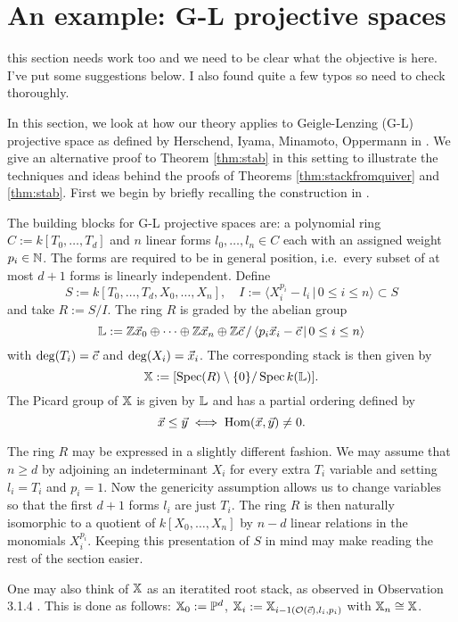 \documentclass[12pt]{amsart}
\begin{document}
\section{An example: G-L projective spaces} \label{sec:HIMO}

{\red this section needs work too and we need to be clear what the objective is here. I've put some suggestions below. I also found quite a few typos so need to check thoroughly.}

In this section, we look at how our theory applies to Geigle-Lenzing (G-L) projective space as defined by Herschend, Iyama, Minamoto, Oppermann in \cite{HIMO}.
We give an alternative proof to Theorem \ref{thm:stab} in this setting to illustrate the techniques and ideas behind the proofs of Theorems \ref{thm:stackfromquiver} and \ref{thm:stab}.
First we begin by briefly recalling the construction in \cite{HIMO}. 

The building blocks for G-L projective spaces are: a polynomial ring $C:= k[T_0, \ldots, T_d]$ and $n$ linear forms $l_0,\ldots,l_n \in C$ each with an assigned weight $p_i \in \mathbb{N}$. 
The forms are required to be in general position, i.e.\ every subset of at most $d+1$ forms is linearly independent. 
Define $$S:= k[T_0,\ldots, T_d, X_0, \ldots, X_n],  \quad I := \langle X_i^{p_i} - l_i \, | \, 0\leq i \leq n \rangle \subset S$$ and take $R:= S/I$. 
The ring $R$ is graded by the abelian group $$\mathbb{L}:= \mathbb{Z} {\vec{x}}_0 \oplus \cdots \oplus \mathbb{Z} {\vec{x}}_n \oplus \mathbb{Z} {\vec{c}} \,/\, \langle p_i {\vec{x}}_i - {\vec{c}} \, | \, 0\leq i \leq n \rangle$$ with $\deg(T_i)={\vec{c}}$ and $\deg(X_i) = {\vec{x}}_i$. 
The corresponding stack is then given by $$\mathbb{X}:= [\operatorname{Spec}(R) \setminus \{0\}/ \operatorname{Spec} k(\mathbb{L})].$$ 
The Picard group of $\mathbb{X}$ is given by $\mathbb{L}$ and has a partial ordering defined by $${\vec{x}} \leq {\vec{y}} \iff \operatorname{Hom}({\vec{x}}, {\vec{y}}) \neq 0.$$

The ring $R$ may be expressed in a slightly different fashion. 
We may assume that $n\geq d$ by adjoining an indeterminant $X_i$ for every extra $T_i$ variable and setting $l_i= T_i$ and $p_i=1$. 
Now the genericity assumption allows us to change variables so that the first $d+1$ forms $l_i$ are just $T_i$.
The ring $R$ is then naturally isomorphic to a quotient of $k[X_0, \ldots, X_n]$ by $n-d$ linear relations in the monomials $X_i^{p_i}$.
Keeping this presentation of $S$ in mind may make reading the rest of the section easier.

One may also think of $\mathbb{X}$ as an iteratited root stack, as observed in Observation 3.1.4 \cite{HIMO}. This is done as follows: $\mathbb{X}_0:= \mathbb{P}^d$, $\mathbb{X}_i := \mathbb{X}_{i-1 (\mathcal{O}({\vec{c}}),l_i,p_i)}$ with $\mathbb{X}_n \cong \mathbb{X}$.
\end{document}
